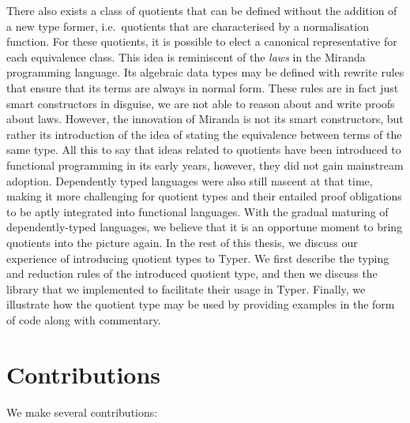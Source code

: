 \documentclass[12pt,twoside,maitrise]{dms}
\theoremstyle{definition}
\numberwithin{equation}{section}
\numberwithin{table}{chapter}
\numberwithin{figure}{chapter}
\begin{document}
There also exists a class of quotients that can be defined without the addition
of a new type former, i.e.\ quotients that are characterised by a normalisation
function\cite{li2015quotient,courtieu-normalizedtypes}. For these quotients, it
is possible to elect a canonical representative for each equivalence class. This
idea is reminiscent of the \emph{laws} in the Miranda programming
language\cite{thompson1986laws}. Its algebraic data types may be defined with
rewrite rules that ensure that its terms are always in normal form. These rules
are in fact just smart constructors in disguise, we are not able to reason about
and write proofs about laws. However, the innovation of Miranda is not its smart
constructors, but rather its introduction of the idea of stating the equivalence
between terms of the same type. All this to say that ideas related to quotients
have been introduced to functional programming in its early years, however, they
did not gain mainstream adoption. Dependently typed languages were also still
nascent at that time, making it more challenging for quotient types and their
entailed proof obligations to be aptly integrated into functional languages.
With the gradual maturing of dependently-typed languages, we believe that it is
an opportune moment to bring quotients into the picture again. In the rest of
this thesis, we discuss our experience of introducing quotient types to Typer.
We first describe the typing and reduction rules of the introduced quotient
type, and then we discuss the library that we implemented to facilitate their
usage in Typer. Finally, we illustrate how the quotient type may be used by
providing examples in the form of code along with commentary.

\section{Contributions}

We make several contributions:
\end{document}
